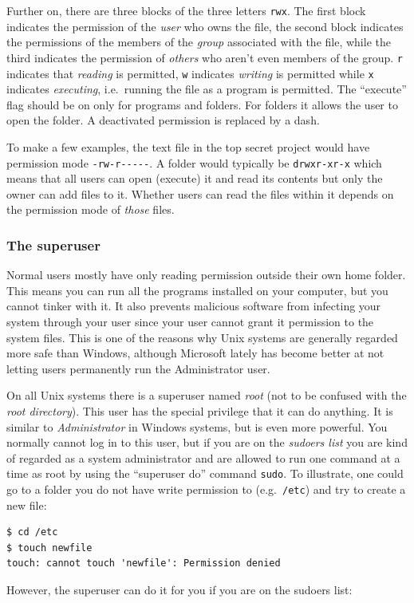 Further on, there are three blocks of the three letters \verb|rwx|. The first block indicates the permission of the \emph{user} who owns the file, the second block indicates the permissions of the members of the \emph{group} associated with the file, while the third indicates the permission of \emph{others} who aren't even members of the group. \verb|r| indicates that \emph{reading} is permitted, \verb|w| indicates \emph{writing} is permitted while \verb|x| indicates \emph{executing}, i.e.\ running the file as a program is permitted. The ``execute'' flag should be on only for programs and folders. For folders it allows the user to open the folder. A deactivated permission is replaced by a dash.

To make a few examples, the text file in the top secret project would have permission mode \verb|-rw-r-----|. A folder would typically be \verb|drwxr-xr-x| which means that all users can open (execute) it and read its contents but only the owner can add files to it. Whether users can read the files within it depends on the permission mode of \emph{those} files.

\subsubsection{The superuser}
Normal users mostly have only reading permission outside their own home folder. This means you can run all the programs installed on your computer, but you cannot tinker with it. It also prevents malicious software from infecting your system through your user since your user cannot grant it permission to the system files. This is one of the reasons why Unix systems are generally regarded more safe than Windows, although Microsoft lately has become better at not letting users permanently run the Administrator user.

On all Unix systems there is a superuser named \emph{root} (not to be confused with the \emph{root directory}). This user has the special privilege that it can do anything. It is similar to \emph{Administrator} in Windows systems, but is even more powerful. You normally cannot log in to this user, but if you are on the \emph{sudoers list} you are kind of regarded as a system administrator and are allowed to run one command at a time as root by using the ``superuser do'' command \verb|sudo|. To illustrate, one could go to a folder you do not have write permission to (e.g.\ \verb|/etc|) and try to create a new file:

\begin{verbatim}
$ cd /etc
$ touch newfile
touch: cannot touch 'newfile': Permission denied
\end{verbatim}
However, the superuser can do it for you if you are on the sudoers list:

